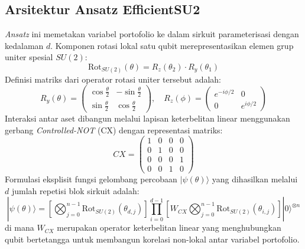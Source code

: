 \subsection{Arsitektur Ansatz EfficientSU2}
\textit{Ansatz} ini memetakan variabel portofolio ke dalam sirkuit parameterisasi dengan kedalaman $d$. Komponen rotasi lokal satu qubit merepresentasikan elemen grup uniter spesial $SU(2)$:
\begin{equation}
\text{Rot}_{SU(2)}(\theta) = R_z(\theta_2) \cdot R_y(\theta_1)
\end{equation}
Definisi matriks dari operator rotasi uniter tersebut adalah:
\begin{equation}
R_y(\theta) = \begin{pmatrix} \cos\frac{\theta}{2} & -\sin\frac{\theta}{2} \\ \sin\frac{\theta}{2} & \cos\frac{\theta}{2} \end{pmatrix}, \quad R_z(\phi) = \begin{pmatrix} e^{-i\phi/2} & 0 \\ 0 & e^{i\phi/2} \end{pmatrix}
\end{equation}
Interaksi antar aset dibangun melalui lapisan keterbelitan linear menggunakan gerbang \textit{Controlled-NOT} (CX) dengan representasi matriks:
\begin{equation}
CX = \begin{pmatrix} 1 & 0 & 0 & 0 \\ 0 & 1 & 0 & 0 \\ 0 & 0 & 0 & 1 \\ 0 & 0 & 1 & 0 \end{pmatrix}
\end{equation}
Formulasi eksplisit fungsi gelombang percobaan $|\psi(\theta) \rangle$ yang dihasilkan melalui $d$ jumlah repetisi blok sirkuit adalah:
\begin{equation}
|\psi(\theta) \rangle = \left[ \bigotimes_{j=0}^{n-1} \text{Rot}_{SU(2)}(\theta_{d,j}) \right] \prod_{i=0}^{d-1} \left[ W_{CX} \bigotimes_{j=0}^{n-1} \text{Rot}_{SU(2)}(\theta_{i,j}) \right] |0 \rangle^{\otimes n}
\end{equation}
di mana $W_{CX}$ merupakan operator keterbelitan linear yang menghubungkan qubit bertetangga untuk membangun korelasi non-lokal antar variabel portofolio.
